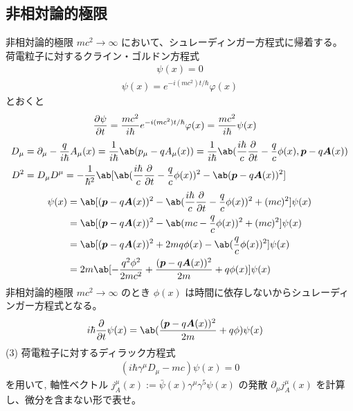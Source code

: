 \documentclass[uplatex,dvipdfmx,a4paper,11pt]{jlreq}
\renewcommand{\AA}{\hat{A}}
\renewcommand{\AA}{\bm{A}}
\newcommand{\pp}{\bm{p}}
\numberwithin{equation}{section}
\theoremstyle{definition}
\begin{document}
\subsection{非相対論的極限}
非相対論的極限 $mc^2\to\infty$ において、シュレーディンガー方程式に帰着する。
荷電粒子に対するクライン・ゴルドン方程式
\begin{align}
  [\hbar^2D^2 + (mc)^2]\psi(x) = 0
\end{align}
\begin{align}
  \psi(x) = e^{-i(mc^2)t/\hbar}\varphi(x)
\end{align}
とおくと
\begin{align}
  \diffp{\psi}{t} & = \frac{mc^2}{i\hbar}e^{-i(mc^2)t/\hbar}\varphi(x) = \frac{mc^2}{i\hbar}\psi(x)
\end{align}
\begin{align}
  D_\mu & = \partial_\mu - \frac{q}{i\hbar}A_\mu(x) = \frac{1}{i\hbar}\ab(p_\mu - qA_\mu(x)) = \frac{1}{i\hbar}\ab(\frac{i\hbar}{c}\diffp{}{t} - \frac{q}{c}\phi(x), \pp - q\AA(x)) \\
  D^2   & = D_\mu D^\mu = -\frac{1}{\hbar^2}\ab[\ab(\frac{i\hbar}{c}\diffp{}{t} - \frac{q}{c}\phi(x))^2 - \ab(\pp - q\AA(x))^2]
\end{align}
\begin{align}
  [\hbar^2D^2 + (mc)^2]\psi(x) & = \ab[(\pp - q\AA(x))^2 - \ab(\frac{i\hbar}{c}\diffp{}{t} - \frac{q}{c}\phi(x))^2 + (mc)^2]\psi(x) \\
                               & = \ab[(\pp - q\AA(x))^2 - \ab(mc - \frac{q}{c}\phi(x))^2 + (mc)^2]\psi(x)                          \\
                               & = \ab[(\pp - q\AA(x))^2 + 2mq\phi(x) - \ab(\frac{q}{c}\phi(x))^2]\psi(x)                           \\
                               & = 2m\ab[-\frac{q^2\phi^2}{2mc^2} + \frac{(\pp - q\bm{A}(x))^2}{2m} + q\phi(x)]\psi(x)
\end{align}
非相対論的極限 $mc^2\to\infty$ のとき $\phi(x)$ は時間に依存しないからシュレーディンガー方程式となる。
\begin{align}
  i\hbar\diffp{}{t}\psi(x) & = \ab(\frac{(\pp - q\bm{A}(x))^2}{2m} + q\phi)\psi(x)
\end{align}
(3) 荷電粒子に対するディラック方程式
\begin{align}
  (i\hbar\gamma^\mu D_\mu - mc)\psi(x) = 0
\end{align}
を用いて, 軸性ベクトル $j_A^\mu(x) := \bar{\psi}(x)\gamma^\mu\gamma^5\psi(x)$ の発散 $\partial_\mu j_A^\mu(x)$ を計算し、微分を含まない形で表せ。
\end{document}
